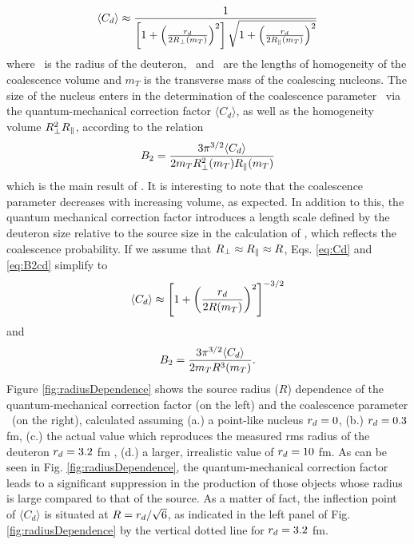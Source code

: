 \documentclass[a4paper,11pt]{scrartcl}
\begin{document}
\begin{equation}
\langle C_{d} \rangle \approx \frac{1}{\left[1+ \left(\frac{r_{d}}{2R_{\perp}(m_{T})}\right)^{2}\right] \sqrt{1+ \left(\frac{r_{d}}{2R_{\|}(m_{T})}\right)^{2}}}
\label{eq:Cd}
\end{equation}
%
where \dradius~is the radius of the deuteron, \rperp~and \rpar~are the lengths of homogeneity of the coalescence volume and $m_{T}$ is the transverse mass of the coalescing nucleons.
The size of the nucleus enters in the determination of the coalescence parameter \btwo~via the quantum-mechanical correction factor $\langle C_{d} \rangle$, as well as the homogeneity volume $R_{\perp}^{2}R_{\|}$, according to the relation
%
\begin{equation}
B_{2} = \frac{3\pi^{3/2} \langle C_{d} \rangle}{2m_{T}R_{\perp}^{2}(m_{T})R_{\|}(m_{T})}
\label{eq:B2cd}
\end{equation}
%
which is the main result of \cite{Scheibl:1998tk}. It is interesting to note that the coalescence parameter decreases with increasing volume, as expected. In addition to this, the quantum mechanical correction factor introduces a length scale defined by the deuteron size relative to the source size in the calculation of \btwo, which reflects the coalescence probability. 
If we assume that  $R_{\perp} \approx R_{\|} \approx R$, Eqs. \ref{eq:Cd} and \ref{eq:B2cd} simplify to 
\begin{equation}
\langle C_{d} \rangle \approx \left[1+ \left(\frac{r_{d}}{2R(m_{T})}\right)^{2}\right]^{-3/2}
\label{eq:Cdapprox}
\end{equation}
%
and
%
\begin{equation}
B_{2} = \frac{3\pi^{3/2} \langle C_{d} \rangle}{2m_{T}R^{3}(m_{T})}.
\label{eq:B2approx}
\end{equation}
%
Figure \ref{fig:radiusDependence} shows the source radius ($R$) dependence of the quantum-mechanical correction factor (on the left) and the coalescence parameter \btwo~(on the right), calculated assuming (a.) a point-like nucleus $r_{d} = 0$, (b.) $r_{d} = 0.3$ fm, (c.) the actual value which reproduces the measured rms radius of the deuteron $r_{d} = 3.2$ fm \cite{Mohr:2015ccw}, (d.) a larger, irrealistic value of  $r_{d} = 10$ fm. 
As can be seen in Fig. \ref{fig:radiusDependence}, the quantum-mechanical correction factor leads to a significant suppression in the production of those objects whose radius is large compared to that of the source. 
As a matter of fact, the inflection point of $\langle C_{d} \rangle$ is situated at $R = r_{d}/\sqrt{6}$, as indicated in the left panel of Fig. \ref{fig:radiusDependence} by the vertical dotted line for $r_{d} = 3.2$ fm.
\end{document}

